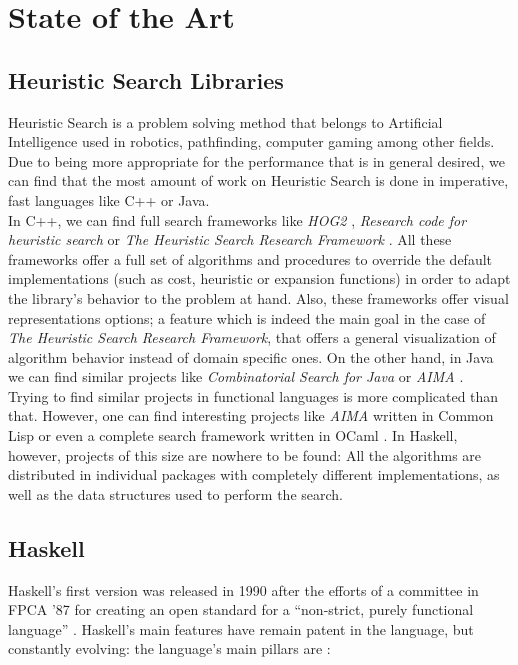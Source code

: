 \section{State of the Art}

\subsection{Heuristic Search Libraries}

Heuristic Search is a problem solving method that belongs to Artificial
Intelligence \cite{rusell-2003-aima} used in robotics, pathfinding, computer
gaming among other fields. Due to being more appropriate for the performance
that is in general desired, we can find that the most amount of work on
Heuristic Search is done in imperative, fast languages like C++ or Java.\\

In C++, we can find full search frameworks like \emph{HOG2} \cite{hog2},
\emph{Research code for heuristic search} \cite{cpp-search} or \emph{The
  Heuristic Search Research Framework} \cite{goldenberg-2017-framework}. All
these frameworks offer a full set of algorithms and procedures to override the
default implementations (such as cost, heuristic or expansion functions) in
order to adapt the library's behavior to the problem at hand. Also, these
frameworks offer visual representations options; a feature which is indeed the
main goal in the case of \emph{The Heuristic Search Research Framework}, that
offers a general visualization of algorithm behavior instead of domain specific
ones. On the other hand, in Java we can find similar projects like
\emph{Combinatorial Search for Java} \cite{cs4j} or \emph{AIMA}
\cite{java-aima}.\\

Trying to find similar projects in functional languages is more complicated
than that. However, one can find interesting projects like \emph{AIMA} written
in Common Lisp \cite{lisp-aima} or even a complete search framework written in
OCaml \cite{ocaml-search}. In Haskell, however, projects of this size are
nowhere to be found: All the algorithms are distributed in individual packages
with completely different implementations, as well as the data structures used
to perform the search.


\subsection{Haskell}

Haskell's first version was released in 1990 after the efforts of a committee
in FPCA '87 for creating an open standard for a ``non-strict, purely functional
language'' \cite{haskell-history}. Haskell's main features have remain patent
in the language, but constantly evolving: the language's main pillars are
\cite{haskell-98, haskell-2010}:

